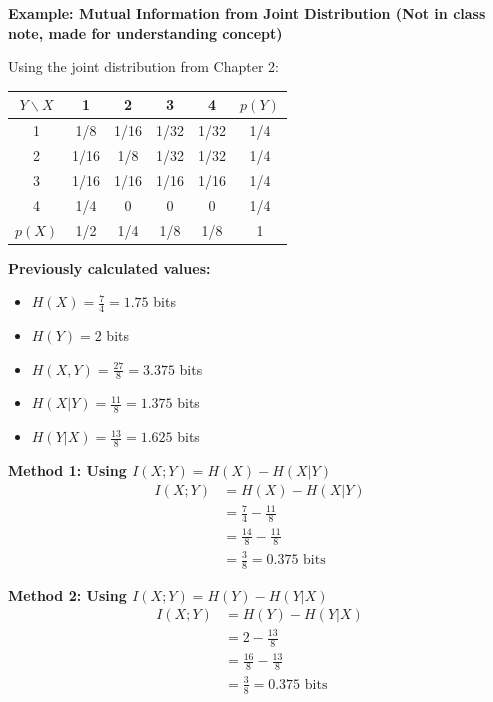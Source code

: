 \documentclass[11pt,a4paper]{book}
\newcounter{qna}[chapter]
\renewcommand{\theqna}{\thechapter.\arabic{qna}}
\newenvironment{questionanswerbox}{
    \refstepcounter{qna}%
    \begin{tcolorbox}[
        enhanced,
        breakable,
        colback=softlavender!10,
        colframe=softlavender!200,
        title={Example~\theqna}, %
        fonttitle=\bfseries,
        coltitle=white,
        colbacktitle=softlavender!200,
        sharp corners,
        boxrule=1pt,
        left=8pt,
        right=8pt,
        top=6pt,
        bottom=6pt
    ]
}{
    \end{tcolorbox}
}
\begin{document}
\begin{questionanswerbox}
    \textbf{Example: Mutual Information from Joint Distribution (Not in class note, made for understanding concept)}

    Using the joint distribution from Chapter 2:

    \begin{center}
        \begin{tabular}{c|cccc|c}
            \(Y \backslash X\) & 1    & 2    & 3    & 4    & \(p(Y)\) \\ \hline
            1                  & 1/8  & 1/16 & 1/32 & 1/32 & 1/4      \\
            2                  & 1/16 & 1/8  & 1/32 & 1/32 & 1/4      \\
            3                  & 1/16 & 1/16 & 1/16 & 1/16 & 1/4      \\
            4                  & 1/4  & 0    & 0    & 0    & 1/4      \\ \hline
            \(p(X)\)           & 1/2  & 1/4  & 1/8  & 1/8  & 1
        \end{tabular}
    \end{center}

    \textbf{Previously calculated values:}
    \begin{itemize}
        \item \(H(X) = \frac{7}{4} = 1.75\) bits
        \item \(H(Y) = 2\) bits
        \item \(H(X,Y) = \frac{27}{8} = 3.375\) bits
        \item \(H(X|Y) = \frac{11}{8} = 1.375\) bits
        \item \(H(Y|X) = \frac{13}{8} = 1.625\) bits
    \end{itemize}

    \hrulefill

    \textbf{Method 1: Using \(I(X;Y) = H(X) - H(X|Y)\)}
    \begin{align*}
        I(X;Y) & = H(X) - H(X|Y)                    \\
               & = \frac{7}{4} - \frac{11}{8}       \\
               & = \frac{14}{8} - \frac{11}{8}      \\
               & = \frac{3}{8} = 0.375 \text{ bits}
    \end{align*}

    \textbf{Method 2: Using \(I(X;Y) = H(Y) - H(Y|X)\)}
    \begin{align*}
        I(X;Y) & = H(Y) - H(Y|X)                    \\
               & = 2 - \frac{13}{8}                 \\
               & = \frac{16}{8} - \frac{13}{8}      \\
               & = \frac{3}{8} = 0.375 \text{ bits}
    \end{align*}


\end{questionanswerbox}
\end{document}
